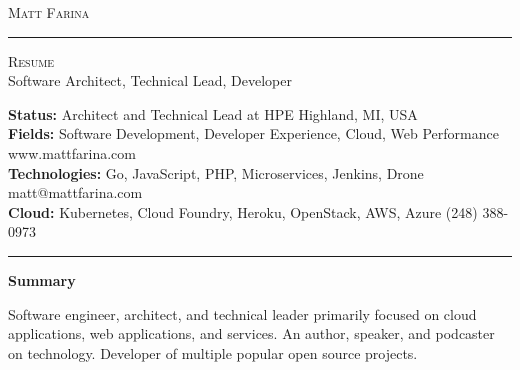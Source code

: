 \documentclass[10pt,A4]{article}
\newcommand{\cvsection}[1]
{
	\begin{center}
		\large\textcolor{sectcol}{\textbf{#1}}
	\end{center}
}
\newcommand{\metasection}[2]
{
\footnotesize{#2} \hspace*{\fill} \footnotesize{#1}\\[1pt]
}
\begin{document}
\pagestyle{fancy}	








\vspace{-8pt}
\begin{center}
	\HUGE \textsc{Matt Farina} \textcolor{sectcol}{\rule[-1mm]{1mm}{0.9cm}} \textsc{Resume}\\[2pt]
	\small Software Architect, Technical Lead, Developer
\end{center}



\vspace{6pt}


\metasection{Highland, MI, USA}{\textbf{Status:} Architect and Technical Lead at HPE}
\metasection{www.mattfarina.com}{\textbf{Fields:} Software Development, Developer Experience, Cloud, Web Performance} 
\metasection{matt@mattfarina.com}{\textbf{Technologies:} Go, JavaScript, PHP, Microservices, Jenkins, Drone}
\metasection{(248) 388-0973}{\textbf{Cloud:} Kubernetes, Cloud Foundry, Heroku, OpenStack, AWS, Azure}
\vspace{-2pt}
\textcolor{softcol}{\hrule}
\vspace{6pt}

\normalsize

\vspace{-6pt}
\cvsection{Summary}
Software engineer, architect, and technical leader primarily focused on cloud applications, web applications, and services. An author, speaker, and podcaster on technology. Developer of multiple popular open source projects.\
\end{document}
